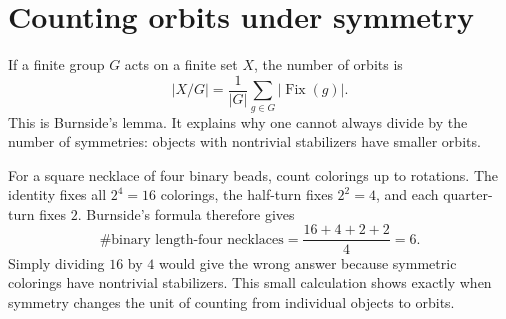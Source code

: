 \section{Counting orbits under symmetry}

If a finite group \(G\) acts on a finite set \(X\), the number of orbits is
\[
  |X/G|=\frac1{|G|}\sum_{g\in G}|\operatorname{Fix}(g)|.
\]
This is Burnside's lemma.  It explains why one cannot always divide by the number of symmetries: objects with nontrivial stabilizers have smaller orbits.

For a square necklace of four binary beads, count colorings up to rotations. The identity fixes all \(2^4=16\) colorings, the half-turn fixes \(2^2=4\), and each quarter-turn fixes \(2\). Burnside's formula therefore gives
\[
 \#\text{binary length-four necklaces}=
 \frac{16+4+2+2}{4}=6.
\]
Simply dividing \(16\) by \(4\) would give the wrong answer because symmetric colorings have nontrivial stabilizers. This small calculation shows exactly when symmetry changes the unit of counting from individual objects to orbits.

